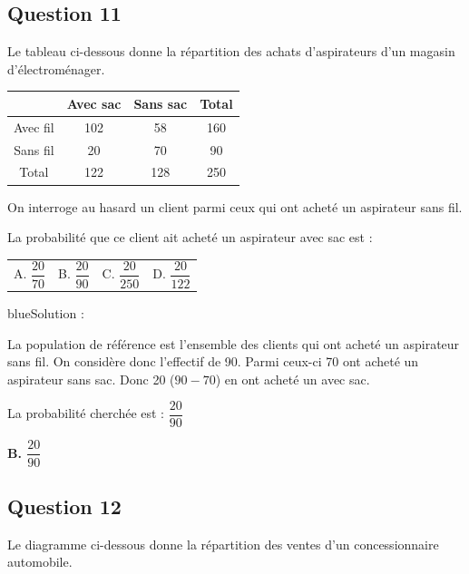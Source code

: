 \subsection*{Question 11}

Le tableau ci-dessous donne la répartition des achats d'aspirateurs d'un magasin d'électroménager.
\begin{center}
\renewcommand{\arraystretch}{1.25}
\begin{tabular}{|c|c|c|c|}\hline
& Avec sac & Sans sac & Total\\\hline
Avec fil & 102 & 58 & 160\\\hline
Sans fil & 20 & 70 & 90\\\hline
Total & 122 & 128 & 250\\\hline
\end{tabular}
\end{center}

On interroge au hasard un client parmi ceux qui ont acheté un aspirateur sans fil.\par
La probabilité que ce client ait acheté un aspirateur avec sac est :
\begin{center}
\begin{tabularx}{.92\linewidth}{XXXX} A. $\dfrac{20}{70}$ & B. $\dfrac{20}{90}$ & C. $\dfrac{20}{250}$ & D. $\dfrac{20}{122}$\end{tabularx}
\end{center}

\begin{color}{blue}Solution :\par
La population de référence est l'ensemble des clients qui ont acheté un aspirateur sans fil. On considère donc l'effectif de 90. Parmi ceux-ci 70 ont acheté un aspirateur sans sac. Donc 20 ($90-70$) en ont acheté un avec sac.

La probabilité cherchée est : $\dfrac{20}{90}$

\textbf{B. $\dfrac{20}{90}$}
\end{color}


\subsection*{Question 12}

Le diagramme ci-dessous donne la répartition des ventes d'un concessionnaire automobile.
\begin{center}
\end{center}

